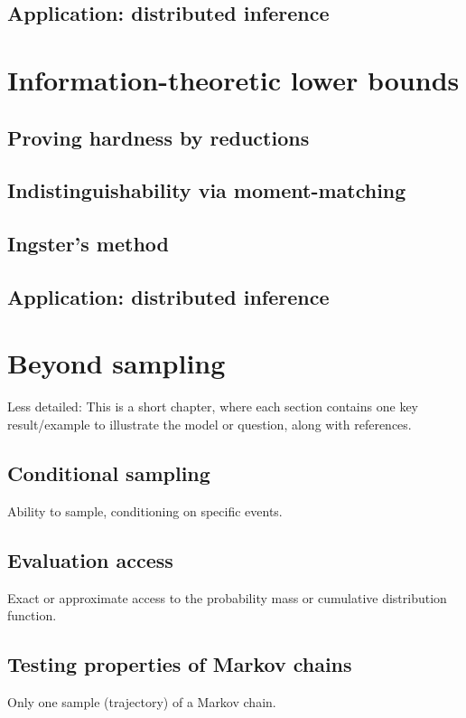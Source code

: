 \documentclass[biber]{nowfnt} %
\begin{document}
\section{Application: distributed inference}

\chapter{Information-theoretic lower bounds}
\section{Proving hardness by reductions}
\section{Indistinguishability via moment-matching}
\section{Ingster's method}
\section{Application: distributed inference}

\chapter{Beyond \iid sampling}
Less detailed: This is a short chapter, where each section contains one key result/example
to illustrate the model or question, along with references.

\section{Conditional sampling}
Ability to sample, conditioning on specific events.

\section{Evaluation access}
Exact or approximate access to the probability mass or cumulative
distribution function.

\section{Testing properties of Markov chains}
Only one sample (trajectory) of a Markov chain.
\end{document}
